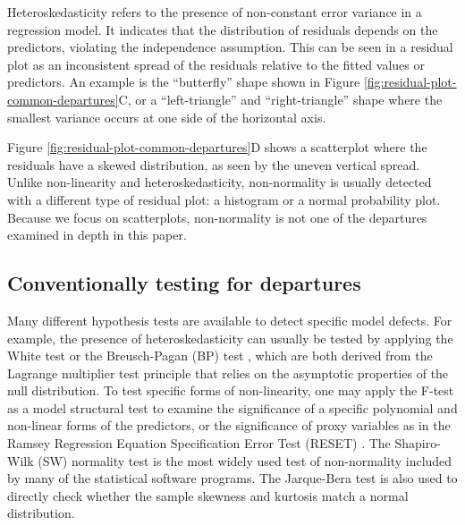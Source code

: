 \documentclass[]{interact}
\theoremstyle{plain}%
\theoremstyle{definition}
\theoremstyle{remark}
\begin{document}
Heteroskedasticity refers to the presence of non-constant error variance
in a regression model. It indicates that the distribution of residuals
depends on the predictors, violating the independence assumption. This
can be seen in a residual plot as an inconsistent spread of the
residuals relative to the fitted values or predictors. An example is the
``butterfly'' shape shown in Figure
\ref{fig:residual-plot-common-departures}C, or a ``left-triangle'' and
``right-triangle'' shape where the smallest variance occurs at one side
of the horizontal axis.

Figure \ref{fig:residual-plot-common-departures}D shows a scatterplot
where the residuals have a skewed distribution, as seen by the uneven
vertical spread. Unlike non-linearity and heteroskedasticity,
non-normality is usually detected with a different type of residual
plot: a histogram or a normal probability plot. Because we focus on
scatterplots, non-normality is not one of the departures examined in
depth in this paper. \citep[ discuss related work on non-normality
checking.]{loy2016variations}

\hypertarget{conventionally-testing-for-departures}{%
\subsection{Conventionally testing for
departures}\label{conventionally-testing-for-departures}}

Many different hypothesis tests are available to detect specific model
defects. For example, the presence of heteroskedasticity can usually be
tested by applying the White test \citep{white1980heteroskedasticity} or
the Breusch-Pagan (BP) test \citep{breusch1979simple}, which are both
derived from the Lagrange multiplier test \citep{silvey1959lagrangian}
principle that relies on the asymptotic properties of the null
distribution. To test specific forms of non-linearity, one may apply the
F-test as a model structural test to examine the significance of a
specific polynomial and non-linear forms of the predictors, or the
significance of proxy variables as in the Ramsey Regression Equation
Specification Error Test (RESET) \citep{ramsey1969tests}. The
Shapiro-Wilk (SW) normality test \citep{shapiro1965analysis} is the most
widely used test of non-normality included by many of the statistical
software programs. The Jarque-Bera test \citep{jarque1980efficient} is
also used to directly check whether the sample skewness and kurtosis
match a normal distribution.
\end{document}
